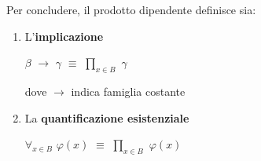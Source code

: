 \vspace{0.5cm}
\noindent
Per concludere, il prodotto dipendente definisce sia:
\begin{enumerate}
\item L'\textbf{implicazione}
\begin{center} $\beta$ $\rightarrow$ $\gamma$ $\equiv$ $\prod\limits_{x \in B}$ $\gamma$ \end{center}
dove $\rightarrow$ indica famiglia costante
\item La \textbf{quantificazione esistenziale}
\begin{center}$\forall_{x \in B}$ $\varphi(x)$ $\equiv$ $\prod\limits_{x \in B}$ $\varphi(x)$ \end{center}
\end{enumerate}


